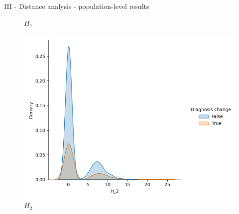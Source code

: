 \documentclass[aspectratio=169, 10pt, dvipsnames]{beamer}
\begin{document}
\begin{frame}[fragile]{III - Distance analysis - population-level results}
\begin{figure}
    \caption{$H_1$}
  \end{figure}%
  \endminipage
  \hfill
  \begin{figure}
    \centering
     \includegraphics[width=\textwidth]{figures/temporal_evolution/landscape_H_2_dist_diag_change.png}
    \caption{$H_2$}
  \end{figure}
  \endminipage
\end{frame}
\end{document}
